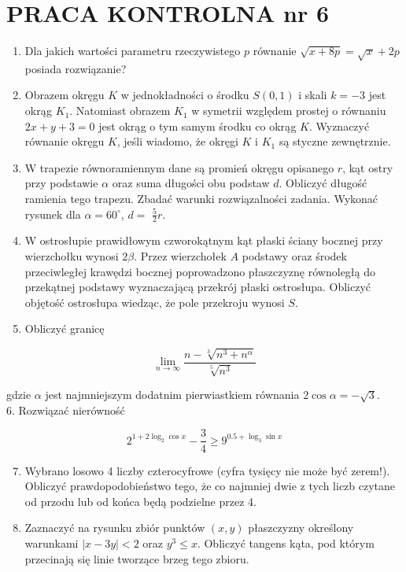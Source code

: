 \documentclass[10pt]{article}
\begin{document}
\section*{PRACA KONTROLNA nr 6}
\begin{enumerate}
  \item Dla jakich wartości parametru rzeczywistego $p$ równanie $\sqrt{x+8 p}=\sqrt{x}+2 p$ posiada rozwiązanie?
  \item Obrazem okręgu $K$ w jednokładności o środku $S(0,1)$ i skali $k=-3$ jest okrąg $K_{1}$. Natomiast obrazem $K_{1}$ w symetrii względem prostej o równaniu $2 x+y+3=0$ jest okrąg o tym samym środku co okrąg $K$. Wyznaczyć równanie okręgu $K$, jeśli wiadomo, że okręgi $K$ i $K_{1}$ są styczne zewnętrznie.
  \item W trapezie równoramiennym dane są promień okręgu opisanego $r$, kąt ostry przy podstawie $\alpha$ oraz suma długości obu podstaw $d$. Obliczyć długość ramienia tego trapezu. Zbadać warunki rozwiązalności zadania. Wykonać rysunek dla $\alpha=60^{\circ}$, $d=$ $\frac{5}{2} r$.
  \item W ostrosłupie prawidłowym czworokątnym kąt płaski ściany bocznej przy wierzchołku wynosi $2 \beta$. Przez wierzchołek $A$ podstawy oraz środek przeciwległej krawędzi bocznej poprowadzono płaszczyznę równoległą do przekątnej podstawy wyznaczającą przekrój płaski ostrosłupa. Obliczyć objętość ostrosłupa wiedząc, że pole przekroju wynosi $S$.
  \item Obliczyć granicę
\end{enumerate}

$$
\lim _{n \rightarrow \infty} \frac{n-\sqrt[3]{n^{3}+n^{\alpha}}}{\sqrt[5]{n^{3}}}
$$

gdzie $\alpha$ jest najmniejszym dodatnim pierwiastkiem równania $2 \cos \alpha=-\sqrt{3}$.\\
6. Rozwiązać nierówność

$$
2^{1+2 \log _{2} \cos x}-\frac{3}{4} \geqslant 9^{0.5+\log _{3} \sin x}
$$

\begin{enumerate}
  \setcounter{enumi}{6}
  \item Wybrano losowo 4 liczby czterocyfrowe (cyfra tysięcy nie może być zerem!). Obliczyć prawdopodobieństwo tego, że co najmniej dwie z tych liczb czytane od przodu lub od końca będą podzielne przez 4.
  \item Zaznaczyć na rysunku zbiór punktów $(x, y)$ płaszczyzny określony warunkami $|x-3 y|<2$ oraz $y^{3} \leqslant x$. Obliczyć tangens kąta, pod którym przecinają się linie tworzące brzeg tego zbioru.
\end{enumerate}
\end{document}
